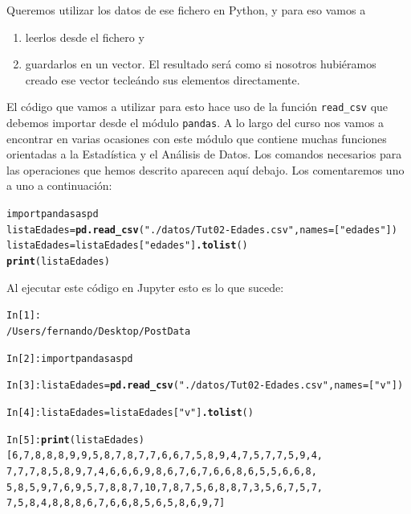 \documentclass[10pt,a4paper]{article}\usepackage[]{graphicx}\usepackage[]{color}
\makeatletter
\newcommand{\hlstr}[1]{\textcolor[rgb]{0.192,0.494,0.8}{#1}}%
\newcommand{\hlkwd}[1]{\textcolor[rgb]{0.737,0.353,0.396}{\textbf{#1}}}%
\newenvironment{kframe}{%
 \def\at@end@of@kframe{}%
 \ifinner\ifhmode%
  \def\at@end@of@kframe{\end{minipage}}%
  \begin{minipage}{\columnwidth}%
 \fi\fi%
 \def\FrameCommand##1{\hskip\@totalleftmargin \hskip-\fboxsep
 \colorbox{shadecolor}{##1}\hskip-\fboxsep
     \hskip-\linewidth \hskip-\@totalleftmargin \hskip\columnwidth}%
 \MakeFramed {\advance\hsize-\width
   \@totalleftmargin\z@ \linewidth\hsize
   \@setminipage}}%
 {\par\unskip\endMakeFramed%
 \at@end@of@kframe}
\newenvironment{knitrout}{}{} %
\newcounter {cont01}
\makeatother
\begin{document}
Queremos utilizar los datos de ese fichero en Python, y para eso vamos a
\begin{enumerate}
\item leerlos desde el fichero y
\item guardarlos en un vector. El resultado será como si nosotros hubiéramos creado ese vector tecleándo sus elementos directamente.
\end{enumerate}
El código que vamos a utilizar para esto hace uso de la función \verb#read_csv# que debemos importar desde el módulo {\tt pandas}. A lo largo del curso nos vamos a encontrar en varias ocasiones con este módulo que contiene muchas funciones orientadas a la Estadística  y el Análisis de Datos. Los comandos necesarios para las operaciones que hemos descrito aparecen aquí debajo. Los comentaremos uno a uno a continuación:
\begin{knitrout}
\color{fgcolor}\begin{kframe}
\begin{alltt}
import pandas as pd
listaEdades = \hlkwd{pd.read_csv}(\hlstr{"./datos/Tut02-Edades.csv"}, names=[\hlstr{"edades"}])
listaEdades = listaEdades[\hlstr{"edades"}]\hlkwd{.tolist}()
\hlkwd{print}(listaEdades)
\end{alltt}
\end{kframe}
\end{knitrout}
Al ejecutar este código en Jupyter esto es lo que sucede:
\begin{knitrout}
\color{fgcolor}\begin{kframe}
\begin{alltt}
In [1]: %
/Users/fernando/Desktop/PostData

In [2]: import pandas as pd

In [3]: listaEdades = \hlkwd{pd.read_csv}(\hlstr{"./datos/Tut02-Edades.csv"}, names=[\hlstr{"v"}])

In [4]: listaEdades = listaEdades[\hlstr{"v"}]\hlkwd{.tolist}()

In [5]: \hlkwd{print}(listaEdades)
[6, 7, 8, 8, 8, 9, 9, 5, 8, 7, 8, 7, 7, 6, 6, 7, 5, 8, 9, 4, 7, 5, 7, 7, 5, 9, 4,
7, 7, 7, 8, 5, 8, 9, 7, 4, 6, 6, 6, 9, 8, 6, 7, 6, 7, 6, 6, 8, 6, 5, 5, 6, 6, 8,
5, 8, 5, 9, 7, 6, 9, 5, 7, 8, 8, 7, 10, 7, 8, 7, 5, 6, 8, 8, 7, 3, 5, 6, 7, 5, 7,
7, 5, 8, 4, 8, 8, 8, 6, 7, 6, 6, 8, 5, 6, 5, 8, 6, 9, 7]
\end{alltt}
\end{kframe}
\end{knitrout}
\end{document}
